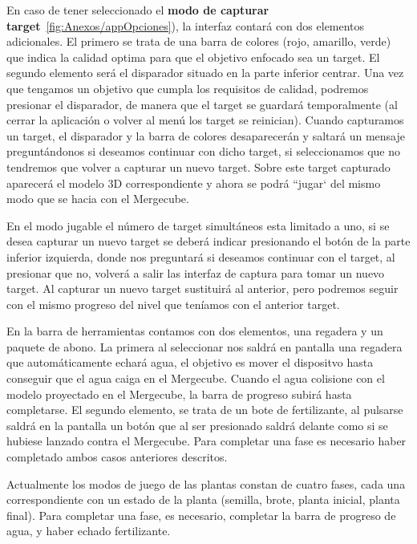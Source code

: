 
En caso de tener seleccionado el \textbf{modo de capturar target}~\ref{fig:Anexos/appOpciones}), la interfaz contará con dos elementos adicionales. El primero se trata de una barra de colores (rojo, amarillo, verde) que indica la calidad optima para que el objetivo enfocado sea un target. El segundo elemento será el disparador situado en la parte inferior centrar. Una vez que tengamos un objetivo que cumpla los requisitos de calidad, podremos presionar el disparador, de manera que el target se guardará temporalmente (al cerrar la aplicación o volver al menú los target se reinician). Cuando capturamos un target, el disparador y la barra de colores desaparecerán y saltará un mensaje preguntándonos si deseamos continuar con dicho target, si seleccionamos que no tendremos que volver a capturar un nuevo target. Sobre este target capturado aparecerá el modelo 3D correspondiente y ahora se podrá ``jugar` del mismo modo que se hacia con el Mergecube. 

En el modo jugable el número de target simultáneos esta limitado a uno, si se desea capturar un nuevo target se deberá indicar presionando el botón de la parte inferior izquierda, donde nos preguntará si deseamos continuar con el target, al presionar que no, volverá a salir las interfaz de captura para tomar un nuevo target. Al capturar un nuevo target sustituirá al anterior, pero podremos seguir con el mismo progreso del nivel que teníamos con el anterior target. 


En la barra de herramientas contamos con dos elementos, una regadera y un paquete de abono. La primera al seleccionar nos saldrá en pantalla una regadera que automáticamente echará agua, el objetivo es mover el dispositvo hasta conseguir que el agua caiga en el Mergecube. Cuando el agua colisione con el modelo proyectado en el Mergecube, la barra de progreso subirá hasta completarse. 
El segundo elemento, se trata de un bote de fertilizante, al pulsarse saldrá en la pantalla un botón que al ser presionado saldrá delante como si se hubiese lanzado contra el Mergecube.
Para completar una fase es necesario haber completado ambos casos anteriores descritos.

Actualmente los modos de juego de las plantas constan de cuatro fases, cada una correspondiente con un estado de la planta (semilla, brote, planta inicial, planta final). Para completar una fase, es necesario, completar la barra de progreso de agua, y haber echado fertilizante.

